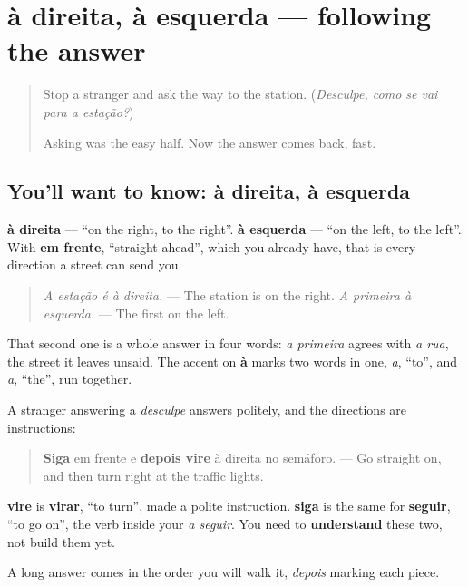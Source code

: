 \section[à direita, à esquerda]{à direita, à esquerda — following the answer}

\label{lesson:PT-C263-direita-esquerda}



\begin{quote}
Stop a stranger and ask the way to the station. (\emph{Desculpe, como se vai para a estação?})

Asking was the easy half. Now the answer comes back, fast.
\end{quote}

\subsection*{You'll want to know: à direita, à esquerda}
\textbf{à direita} — \textquotedblleft{}on the right, to the right\textquotedblright{}. \textbf{à esquerda} — \textquotedblleft{}on the left, to the left\textquotedblright{}. With \textbf{em frente}, \textquotedblleft{}straight ahead\textquotedblright{}, which you already have, that is every direction a street can send you.

\begin{quote}
\emph{A estação é à direita.} — The station is on the right. \emph{A primeira à esquerda.} — The first on the left.
\end{quote}

That second one is a whole answer in four words: \emph{a primeira} agrees with \emph{a rua}, the street it leaves unsaid. The accent on \textbf{à} marks two words in one, \emph{a}, \textquotedblleft{}to\textquotedblright{}, and \emph{a}, \textquotedblleft{}the\textquotedblright{}, run together.

\begin{grammarlens}[title={Grammar Lens: siga em frente, vire à direita}]
A stranger answering a \emph{desculpe} answers politely, and the directions are instructions:

\begin{quote}
\textbf{Siga} em frente e \textbf{depois vire} à direita no semáforo. — Go straight on, and then turn right at the traffic lights.
\end{quote}

\textbf{vire} is \textbf{virar}, \textquotedblleft{}to turn\textquotedblright{}, made a polite instruction. \textbf{siga} is the same for \textbf{seguir}, \textquotedblleft{}to go on\textquotedblright{}, the verb inside your \emph{a seguir}. You need to \textbf{understand} these two, not build them yet.

A long answer comes in the order you will walk it, \emph{depois} marking each piece.
\end{grammarlens}

